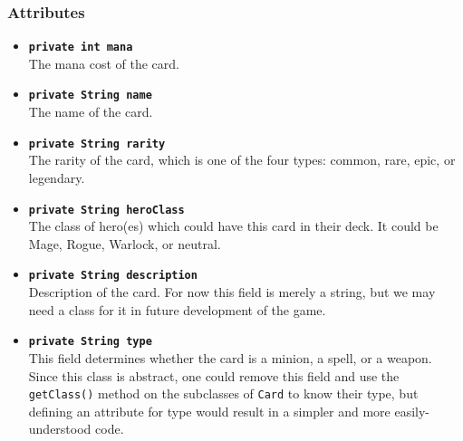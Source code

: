 \documentclass[a4paper]{article}
\begin{document}
\subsubsection{Attributes}
\begin{itemize}
	\item \texttt{\textbf{private int mana}}\\
	The mana cost of the card.
	
	\item \texttt{\textbf{private String name}}\\
	The name of the card.
	
	\item \texttt{\textbf{private String rarity}}\\
	The rarity of the card, which is one of the four types: common, rare, epic, or legendary.
	
	\item \texttt{\textbf{private String heroClass}}\\
	The class of hero(es) which could have this card in their deck. It could be Mage, Rogue, Warlock, or neutral.
	
	\item \texttt{\textbf{private String description}}\\
	Description of the card. For now this field is merely a string, but we may need a class for it in future development of the game.
	
	\item \texttt{\textbf{private String type}}\\
	This field determines whether the card is a minion, a spell, or a weapon. Since this class is abstract, one could remove this field and use the \texttt{getClass()} method on the subclasses of \texttt{Card} to know their type, but defining an attribute for type would result in a simpler and more easily-understood code.
\end{itemize}
\end{document}
